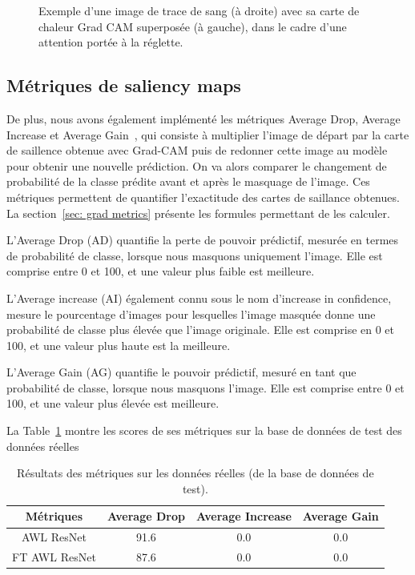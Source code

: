 \begin{figure}[ht]
\begin{subfigure}{0.40\linewidth}
    \end{subfigure}
    \caption{Exemple d'une image de trace de sang (à droite) avec sa carte de chaleur Grad CAM superposée (à gauche), dans le cadre d'une attention portée à la réglette.}
    \label{fig:grad_cam reglette}
\end{figure}

\subsection{Métriques de saliency maps}
De plus, nous avons également implémenté les métriques Average Drop, Average Increase et Average Gain~\cite{opticam}, qui consiste à multiplier l'image de départ par la carte de saillence obtenue avec Grad-CAM puis de redonner cette image au modèle pour obtenir une nouvelle prédiction. On va alors comparer le changement de probabilité de la classe prédite avant et après le masquage de l'image. Ces métriques permettent de quantifier l'exactitude des cartes de saillance obtenues. La section~\ref{sec: grad metrics} présente les formules permettant de les calculer.

L'Average Drop (AD) quantifie la perte de pouvoir prédictif, mesurée en termes de probabilité de classe, lorsque nous masquons uniquement l'image. Elle est comprise entre 0 et 100, et une valeur plus faible est meilleure.

L'Average increase (AI) également connu sous le nom d'increase in confidence, mesure le pourcentage d'images pour lesquelles l'image masquée donne une probabilité de classe plus élevée que l'image originale. Elle est comprise en 0 et 100, et une valeur plus haute est la meilleure.

L'Average Gain (AG) quantifie le pouvoir prédictif, mesuré en tant que probabilité de classe, lorsque nous masquons l'image. Elle est comprise entre 0 et 100, et une valeur plus élevée est meilleure.

La Table~\ref{tab:saliency_results} montre les scores de ses métriques sur la base de données de test des données réelles

\begin{table}[ht]
    \centering
    \begin{tabular}{cccc}
        \toprule
        Métriques & Average Drop & Average Increase & Average Gain \\
        \midrule
        AWL ResNet & 91.6 & 0.0& 0.0\\
        FT AWL ResNet & 87.6 & 0.0 & 0.0\\
        \bottomrule
        \end{tabular}
    \caption{Résultats des métriques sur les données réelles (de la base de données de test).}
    \label{tab:saliency_results}
\end{table}

